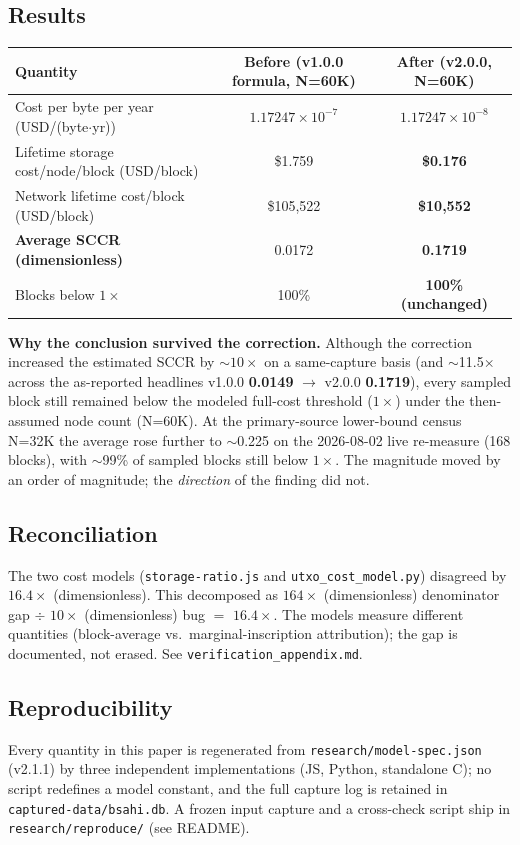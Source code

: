 \documentclass[11pt]{article}
\begin{document}
\subsection{Results}\label{sec:6.3}
\begin{center}
\renewcommand{\arraystretch}{1.2}
\begin{tabular}{lcc}
\toprule
Quantity & Before (v1.0.0 formula, N=60K) & After (v2.0.0, N=60K) \\
\midrule
Cost per byte per year (USD/(byte$\cdot$yr)) & $1.17247\times10^{-7}$ & \textbf{$1.17247\times10^{-8}$} \\
Lifetime storage cost/node/block (USD/block) & \$1.759 & \textbf{\$0.176} \\
Network lifetime cost/block (USD/block) & \$105{,}522 & \textbf{\$10{,}552} \\
\textbf{Average SCCR (dimensionless)} & 0.0172 & \textbf{0.1719} \\
Blocks below $1\times$ & 100\% & \textbf{100\% (unchanged)} \\
\bottomrule
\end{tabular}
\end{center}
\textbf{Why the conclusion survived the correction.} Although the correction increased the estimated SCCR by $\sim10\times$ on a same-capture basis (and $\sim$11.5$\times$ across the as-reported headlines v1.0.0 \textbf{0.0149} $\rightarrow$ v2.0.0 \textbf{0.1719}), every sampled block still remained below the modeled full-cost threshold ($1\times$) under the then-assumed node count (N=60K). At the primary-source lower-bound census N=32K the average rose further to $\sim$0.225 on the 2026-08-02 live re-measure (168 blocks), with $\sim$99\% of sampled blocks still below $1\times$. The magnitude moved by an order of magnitude; the \emph{direction} of the finding did not.

\subsection{Reconciliation}\label{sec:6.4}
The two cost models (\texttt{storage-ratio.js} and \texttt{utxo\_cost\_model.py}) disagreed by $16.4\times$ (dimensionless). This decomposed as $164\times$ (dimensionless) denominator gap $\div$ $10\times$ (dimensionless) bug $=$ $16.4\times$. The models measure different quantities (block-average vs.\ marginal-inscription attribution); the gap is documented, not erased. See \texttt{verification\_appendix.md}.

\subsection{Reproducibility}\label{sec:6.5}
Every quantity in this paper is regenerated from \texttt{research/model-spec.json} (v2.1.1) by three independent implementations (JS, Python, standalone C); no script redefines a model constant, and the full capture log is retained in \texttt{captured-data/bsahi.db}. A frozen input capture and a cross-check script ship in \texttt{research/reproduce/} (see README).
\end{document}
